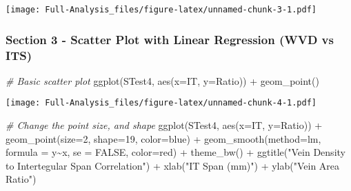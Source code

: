\documentclass[
]{article}
\newenvironment{Shaded}{\begin{snugshade}}{\end{snugshade}}
\newcommand{\AttributeTok}[1]{\textcolor[rgb]{0.77,0.63,0.00}{#1}}
\newcommand{\CommentTok}[1]{\textcolor[rgb]{0.56,0.35,0.01}{\textit{#1}}}
\newcommand{\ConstantTok}[1]{\textcolor[rgb]{0.00,0.00,0.00}{#1}}
\newcommand{\DecValTok}[1]{\textcolor[rgb]{0.00,0.00,0.81}{#1}}
\newcommand{\FunctionTok}[1]{\textcolor[rgb]{0.00,0.00,0.00}{#1}}
\newcommand{\NormalTok}[1]{#1}
\newcommand{\SpecialCharTok}[1]{\textcolor[rgb]{0.00,0.00,0.00}{#1}}
\newcommand{\StringTok}[1]{\textcolor[rgb]{0.31,0.60,0.02}{#1}}
\begin{document}
\texttt{[image: Full-Analysis\_files/figure-latex/unnamed-chunk-3-1.pdf]}

\hypertarget{section-3---scatter-plot-with-linear-regression-wvd-vs-its}{%
\subsubsection{Section 3 - Scatter Plot with Linear Regression (WVD vs
ITS)}\label{section-3---scatter-plot-with-linear-regression-wvd-vs-its}}

\begin{Shaded}
\begin{Highlighting}[]
\CommentTok{\# Basic scatter plot}
\FunctionTok{ggplot}\NormalTok{(STest4, }\FunctionTok{aes}\NormalTok{(}\AttributeTok{x=}\NormalTok{IT, }\AttributeTok{y=}\NormalTok{Ratio)) }\SpecialCharTok{+} \FunctionTok{geom\_point}\NormalTok{()}
\end{Highlighting}
\end{Shaded}

\texttt{[image: Full-Analysis\_files/figure-latex/unnamed-chunk-4-1.pdf]}

\begin{Shaded}
\begin{Highlighting}[]
\CommentTok{\# Change the point size, and shape}
\FunctionTok{ggplot}\NormalTok{(STest4, }\FunctionTok{aes}\NormalTok{(}\AttributeTok{x=}\NormalTok{IT, }\AttributeTok{y=}\NormalTok{Ratio)) }\SpecialCharTok{+}
  \FunctionTok{geom\_point}\NormalTok{(}\AttributeTok{size=}\DecValTok{2}\NormalTok{, }\AttributeTok{shape=}\DecValTok{19}\NormalTok{, }\AttributeTok{color=}\StringTok{\textquotesingle{}blue\textquotesingle{}}\NormalTok{) }\SpecialCharTok{+}
  \FunctionTok{geom\_smooth}\NormalTok{(}\AttributeTok{method=}\StringTok{\textquotesingle{}lm\textquotesingle{}}\NormalTok{, }\AttributeTok{formula =}\NormalTok{ y}\SpecialCharTok{\textasciitilde{}}\NormalTok{x, }\AttributeTok{se =} \ConstantTok{FALSE}\NormalTok{, }\AttributeTok{color=}\StringTok{\textquotesingle{}red\textquotesingle{}}\NormalTok{) }\SpecialCharTok{+} 
  \FunctionTok{theme\_bw}\NormalTok{() }\SpecialCharTok{+}
  \FunctionTok{ggtitle}\NormalTok{(}\StringTok{"Vein Density to Intertegular Span Correlation"}\NormalTok{) }\SpecialCharTok{+}
  \FunctionTok{xlab}\NormalTok{(}\StringTok{"IT Span (mm)"}\NormalTok{) }\SpecialCharTok{+}
  \FunctionTok{ylab}\NormalTok{(}\StringTok{"Vein Area Ratio"}\NormalTok{)}
\end{Highlighting}
\end{Shaded}
\end{document}
